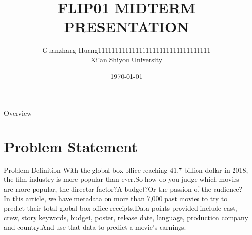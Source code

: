\documentclass[
 size=12pt,
 paper=smartboard, %
 mode=present, %
 display=slides, %
style=tuliplab,
pauseslide,
fleqn,leqno]{powerdot}
\title{FLIP01 MIDTERM PRESENTATION}
\author{
Guanzhang Huang111111111111111111111111111111111
\\
Xi'an Shiyou University 
}
\date{\today}
\begin{document}
\maketitle 
\begin{slide}[toc=,bm=]{Overview}
  \tableofcontents[content=sections]
\end{slide}

  \section{Problem Statement}

  \begin{slide}{Problem Definition}
 \hspace{0.5cm}  
 With the global box office reaching 41.7 billion dollar in 2018, the film industry is more popular than ever.So how do you judge which movies are more popular, the director factor?A budget?Or the passion of the audience?
 In this article, we have metadata on more than 7,000 past movies to try to predict their total global box office receipts.Data points provided include cast, crew, story keywords, budget, poster, release date, language, production company and country.And use that data to predict a movie's earnings.
  \end{slide}
\end{document}
